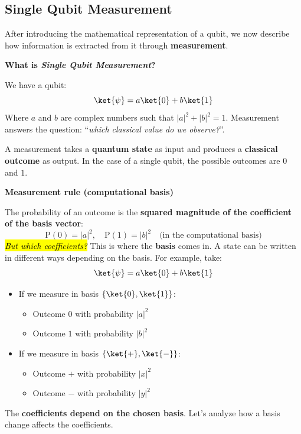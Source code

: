 \subsection{Single Qubit Measurement}

After introducing the mathematical representation of a qubit, we now describe how information is extracted from it through \textbf{measurement}.

\highspace
\begin{flushleft}
    \textcolor{Green3}{ \textbf{What is \emph{Single Qubit Measurement}?}}
\end{flushleft}
We have a qubit:
\begin{equation*}
    \ket{\psi} = a\ket{0} + b\ket{1}
\end{equation*}
Where $a$ and $b$ are complex numbers such that $|a|^2 + |b|^2 = 1$. Measurement answers the question: ``\emph{which classical value do we observe?}''.

\highspace
A measurement takes a \textbf{quantum state} as input and produces a \textbf{classical outcome} as output. In the case of a single qubit, the possible outcomes are $0$ and $1$.

\highspace
\begin{flushleft}
    \textcolor{Red2}{ \textbf{Measurement rule (computational basis)}}
\end{flushleft}
The probability of an outcome is the \textbf{squared magnitude of the coefficient of the basis vector}:
\begin{equation*}
    \text{P}(0) = |a|^2, \quad \text{P}(1) = |b|^2 \quad \text{(in the computational basis)}
\end{equation*}
\hl{\emph{But which coefficients?}} This is where the \textbf{basis} comes in. A state can be written in different ways depending on the basis. For example, take:
\begin{equation*}
    \ket{\psi} = a\ket{0} + b\ket{1} 
\end{equation*}
\begin{itemize}
    \item If we measure in basis $\{\ket{0}, \ket{1}\}$:
    \begin{itemize}
        \item Outcome $0$ with probability $|a|^2$
        \item Outcome $1$ with probability $|b|^2$
    \end{itemize}
    \item If we measure in basis $\{\ket{+}, \ket{-}\}$:
    \begin{itemize}
        \item Outcome $+$ with probability $|x|^2$
        \item Outcome $-$ with probability $|y|^2$
    \end{itemize}
\end{itemize}
The \textbf{coefficients depend on the chosen basis}. Let's analyze how a basis change affects the coefficients.


